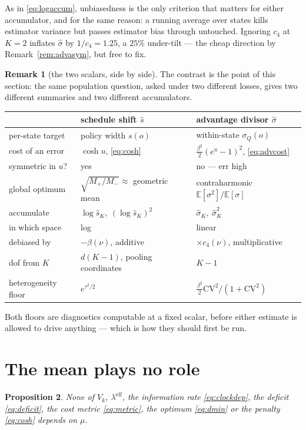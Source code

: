 \documentclass[11pt]{article}
\newtheorem{proposition}{Proposition}
\theoremstyle{definition}
\newtheorem{remark}[proposition]{Remark}
\newcommand{\E}{\mathbb{E}}
\newcommand{\leff}{\lambda^{\mathrm{eff}}}
\begin{document}
As in \eqref{eq:logaccum}, unbiasedness is the only criterion that matters for
either accumulator, and for the same reason: a running average over states kills
estimator variance but passes estimator bias through untouched. Ignoring $c_4$
at $K=2$ inflates $\hat\sigma$ by $1/c_4=1.25$, a $25\%$ under-tilt --- the cheap
direction by Remark~\ref{rem:advasym}, but free to fix.

\begin{remark}[the two scalars, side by side]
\label{rem:twoscalars}
The contrast is the point of this section: the same population question, asked
under two different losses, gives two different summaries and two different
accumulators.
\begin{center}\small
\begin{tabular}{lll}
\toprule
 & schedule shift $\hat s$ & advantage divisor $\hat\sigma$ \\
\midrule
per-state target & policy width $s(o)$ & within-state $\sigma_Q(o)$ \\
cost of an error & $\cosh u$, \eqref{eq:cosh}
  & $\tfrac{\beta^2}{2}(e^u-1)^2$, \eqref{eq:advcost} \\
symmetric in $u$? & yes & no --- err high \\
global optimum & $\sqrt{M_+/M_-}\approx$ geometric mean
  & contraharmonic $\E[\sigma^2]/\E[\sigma]$ \\
accumulate & $\log\hat s_K,\ (\log\hat s_K)^2$
  & $\hat\sigma_K,\ \hat\sigma_K^2$ \\
in which space & log & linear \\
debiased by & $-\beta(\nu)$, additive & $\times c_4(\nu)$, multiplicative \\
dof from $K$ & $d(K-1)$, pooling coordinates & $K-1$ \\
heterogeneity floor & $e^{\tau^2/2}$
  & $\tfrac{\beta^2}{2}\mathrm{CV}^2/(1+\mathrm{CV}^2)$ \\
\bottomrule
\end{tabular}
\end{center}
Both floors are diagnostics computable at a fixed scalar, before either estimate
is allowed to drive anything --- which is how they should first be run.
\end{remark}

\section{The mean plays no role}
\label{sec:mean}

\begin{proposition}
None of $V_k$, $\leff$, the information rate \eqref{eq:clockdep}, the deficit
\eqref{eq:deficit}, the cost metric \eqref{eq:metric}, the optimum
\eqref{eq:dmin} or the penalty \eqref{eq:cosh} depends on $\mu$.
\end{proposition}
\end{document}
